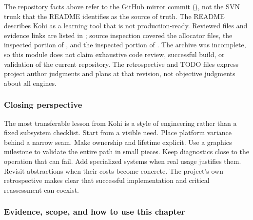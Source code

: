 The repository facts above refer to the GitHub mirror commit  (), not the SVN trunk that the README identifies as the source of truth. The README describes Kohi as a learning tool that is not production-ready. Reviewed files and evidence links are listed in ; source inspection covered the allocator files, the inspected portion of , and the inspected portion of . The archive was incomplete, so this module does not claim exhaustive code review, successful build, or validation of the current repository. The retrospective and TODO files express project author judgments and plans at that revision, not objective judgments about all engines.

\subsubsection{Closing perspective}\label{06-engine-ii-ch042-closing-perspective}

\hypertarget{06-engine-ii-ch042-closing-perspective}{}

The most transferable lesson from Kohi is a style of engineering rather than a fixed subsystem checklist. Start from a visible need. Place platform variance behind a narrow seam. Make ownership and lifetime explicit. Use a graphics milestone to validate the entire path in small pieces. Keep diagnostics close to the operation that can fail. Add specialized systems when real usage justifies them. Revisit abstractions when their costs become concrete. The project's own retrospective makes clear that successful implementation and critical reassessment can coexist.

\subsubsection{Evidence, scope, and how to use this chapter}\label{06-engine-ii-ch042-evidence-scope-and-how-to-use-this-chapter}

\hypertarget{06-engine-ii-ch042-evidence-scope-and-how-to-use-this-chapter}{}


